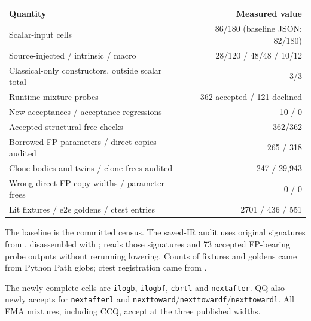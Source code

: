 \begin{tabular}{@{}lr@{}}\toprule
Quantity & Measured value \\ \midrule
Scalar-input cells & 86/180 (baseline JSON: 82/180) \\
Source-injected / intrinsic / macro & 28/120 / 48/48 / 10/12 \\
Classical-only constructors, outside scalar total & 3/3 \\
Runtime-mixture probes & 362 accepted / 121 declined \\
New acceptances / acceptance regressions & 10 / 0 \\
Accepted structural free checks & 362/362 \\
Borrowed FP parameters / direct copies audited & 265 / 318 \\
Clone bodies and twins / clone frees audited & 247 / 29,943 \\
Wrong direct FP copy widths / parameter frees & 0 / 0 \\
Lit fixtures / e2e goldens / ctest entries & 2701 / 436 / 551 \\
\bottomrule\end{tabular}

The baseline is the committed  census. The saved-IR audit uses
original signatures from , disassembled with
;
 reads
those signatures and 73 accepted FP-bearing probe outputs without rerunning
lowering. Counts of fixtures and goldens came from Python Path globs; ctest
registration came from .

The newly complete cells are \texttt{ilogb}, \texttt{ilogbf}, \texttt{cbrtl} and
\texttt{nextafter}. QQ also newly accepts for \texttt{nextafterl} and
\texttt{nexttoward}/\texttt{nexttowardf}/\texttt{nexttowardl}. All FMA mixtures,
including CCQ, accept at the three published widths.

